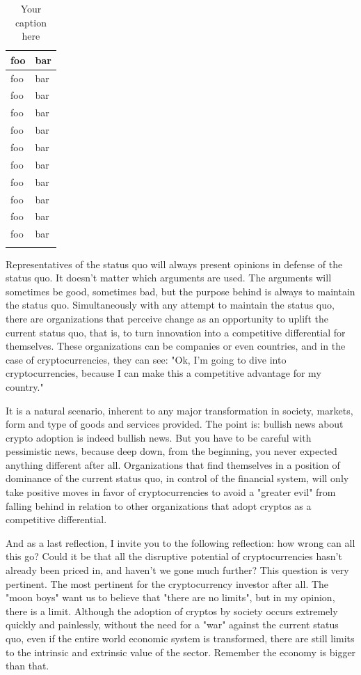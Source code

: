 \begin{longtable}{| p{} | p{} |}
\hline
foo & bar \\ \hline
foo & bar \\ \hline
foo & bar \\ \hline
foo & bar \\ \hline
foo & bar \\ \hline
foo & bar \\ \hline
foo & bar \\ \hline
foo & bar \\ \hline
foo & bar \\ \hline
foo & bar \\ \hline
foo & bar \\ \hline
\caption{Your caption here} %
\label{tab:myfirstlongtable}
\end{longtable}

Representatives of the status quo will always present opinions in defense of the status quo. It doesn't matter which arguments are used. The arguments will sometimes be good, sometimes bad, but the purpose behind is always to maintain the status quo. Simultaneously with any attempt to maintain the status quo, there are organizations that perceive change as an opportunity to uplift the current status quo, that is, to turn innovation into a competitive differential for themselves. These organizations can be companies or even countries, and in the case of cryptocurrencies, they can see: "Ok, I'm going to dive into cryptocurrencies, because I can make this a competitive advantage for my country."

It is a natural scenario, inherent to any major transformation in society, markets, form and type of goods and services provided. The point is: bullish news about crypto adoption is indeed bullish news. But you have to be careful with pessimistic news, because deep down, from the beginning, you never expected anything different after all. Organizations that find themselves in a position of dominance of the current status quo, in control of the financial system, will only take positive moves in favor of cryptocurrencies to avoid a "greater evil" from falling behind in relation to other organizations that adopt cryptos as a competitive differential.

And as a last reflection, I invite you to the following reflection: how wrong can all this go? Could it be that all the disruptive potential of cryptocurrencies hasn't already been priced in, and haven't we gone much further? This question is very pertinent. The most pertinent for the cryptocurrency investor after all. The "moon boys" want us to believe that "there are no limits", but in my opinion, there is a limit. Although the adoption of cryptos by society occurs extremely quickly and painlessly, without the need for a "war" against the current status quo, even if the entire world economic system is transformed, there are still limits to the intrinsic and extrinsic value of the sector. Remember the economy is bigger than that.

